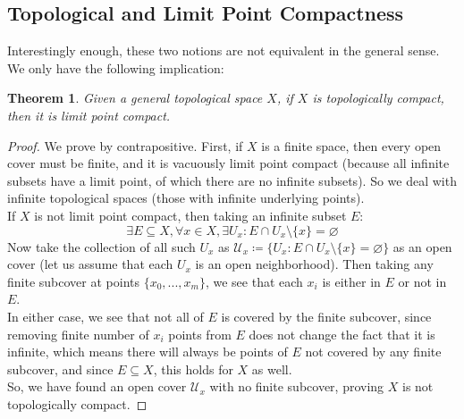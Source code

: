 \documentclass[10pt,letterpaper]{article} %
\newtheorem{thm}{Theorem}[section]
\begin{document}
\subsection{Topological and Limit Point Compactness}
Interestingly enough, these two notions are not equivalent in the general sense. We only have the following implication:
\begin{thm}
Given a general topological space $X$, if $X$ is topologically compact, then it is limit point compact.
\end{thm}
\begin{proof}
We prove by contrapositive. First, if $X$ is a finite space, then every open cover must be finite, and it is vacuously limit point compact (because all infinite subsets have a limit point, of which there are no infinite subsets). So we deal with infinite topological spaces (those with infinite underlying points).\\

If $X$ is not limit point compact, then taking an infinite subset $E$:
\begin{equation*}
\exists E \subseteq X, \forall x \in X, \exists U_x: E \cap U_x \setminus \{x\} = \varnothing
\end{equation*}
Now take the collection of all such $U_x$ as $\mathcal{U}_x \coloneq \{U_x : E \cap U_x \setminus \{x\} = \varnothing\}$ as an open cover (let us assume that each $U_x$ is an open neighborhood). Then taking any finite subcover at points $\{x_0, ..., x_m\}$, we see that each $x_i$ is either in $E$ or not in $E$.\\

In either case, we see that not all of $E$ is covered by the finite subcover, since removing finite number of $x_i$ points from $E$ does not change the fact that it is infinite, which means there will always be points of $E$ not covered by any finite subcover, and since $E \subseteq X$, this holds for $X$ as well.\\

So, we have found an open cover $\mathcal{U}_x$ with no finite subcover, proving $X$ is not topologically compact.
\end{proof}
\end{document}
